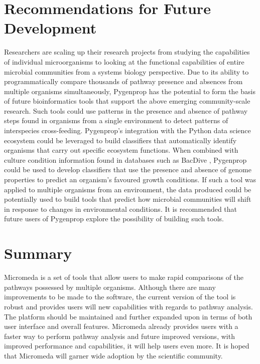 \section{Recommendations for Future Development}

Researchers are scaling up their research projects from studying the capabilities of individual microorganisms to looking at the functional capabilities of entire microbial communities from a systems biology perspective. Due to its ability to programmatically compare thousands of pathway presence and absences from multiple organisms simultaneously, Pygenprop has the potential to form the basis of future bioinformatics tools that support the above emerging community-scale research. Such tools could use patterns in the presence and absence of pathway steps found in organisms from a single environment to detect patterns of interspecies cross-feeding. Pygenprop's integration with the Python data science ecosystem could be leveraged to build classifiers that automatically identify organisms that carry out specific ecosystem functions. When combined with culture condition information found in databases such as BacDive \cite{reimer2018bac}, Pygenprop could be used to develop classifiers that use the presence and absence of genome properties to predict an organism's favoured growth conditions. If such a tool was applied to multiple organisms from an environment, the data produced could be potentially used to build tools that predict how microbial communities will shift in response to changes in environmental conditions. It is recommended that future users of Pygenprop explore the possibility of building such tools.

\section{Summary}

Micromeda is a set of tools that allow users to make rapid comparisons of the pathways possessed by multiple organisms. Although there are many improvements to be made to the software, the current version of the tool is robust and provides users will new capabilities with regards to pathway analysis. The platform should be maintained and further expanded upon in terms of both user interface and overall features. Micromeda already provides users with a faster way to perform pathway analysis and future improved versions, with improved performance and capabilities, it will help users even more. It is hoped that Micromeda will garner wide adoption by the scientific community.